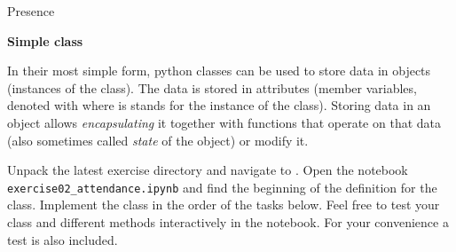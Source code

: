 \documentclass[a4paper, draft=False]{scrartcl}
\begin{document}



\begin{exam}[Presence]{Presence}
  \begin{instructions}

    \begin{problem*}\textbf{Simple class}

      In their most simple form, python classes can be used to store data in
      objects (instances of the class). The data is stored in attributes
      (member variables, denoted with  where  is
      stands for the instance of the class). Storing data in an object allows
      \emph{encapsulating} it together with functions that operate on that data
      (also sometimes called \emph{state} of the object) or modify it.

      Unpack the latest exercise directory and navigate to
      . Open the notebook
      \texttt{exercise02\_attendance.ipynb} and find the beginning of the definition
      for the  class. Implement the class in the order of the tasks
      below. Feel free to test your class and different methods interactively in
      the notebook. For your convenience a test is also included.


\end{problem*}
\end{instructions}
\end{exam}
\end{document}

